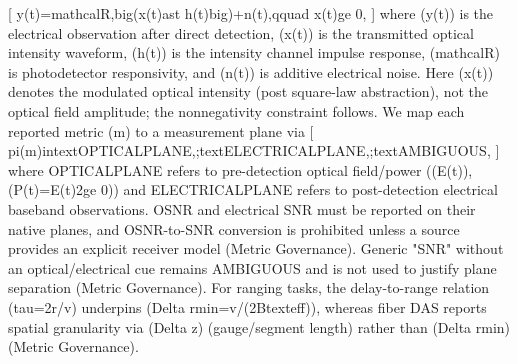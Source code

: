 {}[\markdownRendererSoftLineBreak
{}y(t)=\markdownRendererBackslash{}mathcal\markdownRendererLeftBrace{}R\markdownRendererRightBrace{},\markdownRendererBackslash{}big(x(t)\markdownRendererBackslash{}ast h(t)\markdownRendererBackslash{}big)+n(t),\markdownRendererBackslash{}qquad x(t)\markdownRendererBackslash{}ge 0,\markdownRendererSoftLineBreak
{}]\markdownRendererSoftLineBreak
{}where (y(t)) is the electrical observation after direct detection, (x(t)) is the transmitted optical intensity waveform, (h(t)) is the intensity channel impulse response, (\markdownRendererBackslash{}mathcal\markdownRendererLeftBrace{}R\markdownRendererRightBrace{}) is photodetector responsivity, and (n(t)) is additive electrical noise. Here (x(t)) denotes the modulated optical intensity (post square-law abstraction), not the optical field amplitude; the nonnegativity constraint follows.\markdownRendererParagraphSeparator
{} We map each reported metric (m) to a measurement plane via\markdownRendererSoftLineBreak
{}[\markdownRendererSoftLineBreak
{}\markdownRendererBackslash{}pi(m)\markdownRendererBackslash{}in\markdownRendererLeftBrace{}\markdownRendererBackslash{}text\markdownRendererLeftBrace{}OPTICAL\markdownRendererUnderscore{}PLANE\markdownRendererRightBrace{},;\markdownRendererBackslash{}text\markdownRendererLeftBrace{}ELECTRICAL\markdownRendererUnderscore{}PLANE\markdownRendererRightBrace{},;\markdownRendererBackslash{}text\markdownRendererLeftBrace{}AMBIGUOUS\markdownRendererRightBrace{}\markdownRendererRightBrace{},\markdownRendererSoftLineBreak
{}]\markdownRendererSoftLineBreak
{}where OPTICAL\markdownRendererUnderscore{}PLANE refers to pre-detection optical field/power ((E(t)), (P(t)=\markdownRendererPipe{}E(t)\markdownRendererPipe{}\markdownRendererCircumflex{}2\markdownRendererBackslash{}ge 0)) and ELECTRICAL\markdownRendererUnderscore{}PLANE refers to post-detection electrical baseband observations. OSNR and electrical SNR must be reported on their native planes, and OSNR-to-SNR conversion is prohibited unless a source provides an explicit receiver model (Metric Governance). Generic "SNR" without an optical/electrical cue remains AMBIGUOUS and is not used to justify plane separation (Metric Governance). For ranging tasks, the delay-to-range relation (\markdownRendererBackslash{}tau=2r/v) underpins (\markdownRendererBackslash{}Delta r\markdownRendererUnderscore{}\markdownRendererLeftBrace{}\markdownRendererBackslash{}min\markdownRendererRightBrace{}=v/(2B\markdownRendererUnderscore{}\markdownRendererLeftBrace{}\markdownRendererBackslash{}text\markdownRendererLeftBrace{}eff\markdownRendererRightBrace{}\markdownRendererRightBrace{})), whereas fiber DAS reports spatial granularity via (\markdownRendererBackslash{}Delta z) (gauge/segment length) rather than (\markdownRendererBackslash{}Delta r\markdownRendererUnderscore{}\markdownRendererLeftBrace{}\markdownRendererBackslash{}min\markdownRendererRightBrace{}) (Metric Governance).\markdownRendererParagraphSeparator
